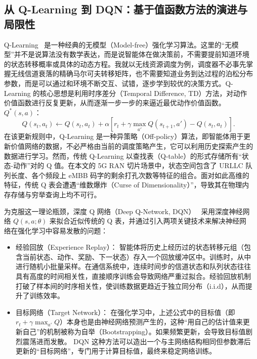 \subsection{从 Q-Learning 到 DQN：基于值函数方法的演进与局限性}\label{222-从-q-learning-到-dqn基于值函数方法的进展与瓶颈}
Q-Learning~\cite{watkins1992} 是一种经典的无模型（Model-free）强化学习算法。这里的“无模型”并不是说算法没有数学表达，而是说智能体在做决策前，不需要提前知道环境的状态转移概率或具体的动态方程。我就以无线资源调度为例，调度器不必事先掌握无线信道衰落的精确马尔可夫转移矩阵，也不需要知道业务到达过程的泊松分布参数，而是可以通过和环境不断交互、试错，逐步学到较优的决策方式。Q-Learning 的核心思想是利用时序差分（Temporal Difference, TD）方法，对动作价值函数进行反复更新，从而逐渐一步一步的来逼近最优动作价值函数。$Q^*(s, a)$：
\begin{equation}
Q(s_t, a_t) \leftarrow Q(s_t, a_t) + \alpha \left[ r_t + \gamma \max_{a'} Q(s_{t+1}, a') - Q(s_t, a_t) \right].
\label{eq:q_learning_update}
\end{equation}
在该更新规则中，Q-Learning 是一种异策略（Off-policy）算法，即智能体用于更新价值网络的数据，不必严格由当前的调度策略产生，它可以利用历史探索产生的数据进行学习。然而，传统 Q-Learning 以查找表（Q-table）的形式存储所有“状态-动作”对的 Q 值。在本文的 5G RAN 切片场景中，状态空间包含了 URLLC 队列长度、各个频段上 eMBB 码字的剩余打孔次数等特征的组合。面对如此高维的特征，传统 Q 表会遭遇“维数爆炸（Curse of Dimensionality）”，导致其在物理内存存储与穷举查询上均不可行。

为克服这一理论瓶颈，深度 Q 网络（Deep Q-Network, DQN）~\cite{fan2020} 采用深度神经网络 $Q(s, a; \theta)$ 来拟合近似传统的 Q 表，并通过引入两项关键技术来解决神经网络在强化学习中容易发散的问题：
\begin{itemize}
\item 经验回放（Experience Replay）： 智能体将历史上经历过的状态转移元组（包含当前状态、动作、奖励、下一状态）存入一个回放缓冲区中。训练时，从中进行随机小批量采样。在通信系统中，连续时间步的信道状态和队列状态往往具有高度的时间相关性，直接顺序训练会导致网络严重过拟合。经验回放机制打破了样本间的时序相关性，使训练数据更趋近于独立同分布（i.i.d），从而提升了训练效率。
\item 目标网络（Target Network）： 在强化学习中，上述公式中的目标值（即 $r_t + \gamma \max_{a'} Q$）本身也是由神经网络预测产生的，这种“用自己的估计值来更新自己”的机制被称为自举（Bootstrapping）。如果频繁更新，会导致目标值剧烈震荡进而发散。
DQN 这种方法可以造出一个与主网络结构相同但参数滞后更新的“目标网络”，专门用于计算目标值，最终来稳定网络训练。
\end{itemize}

